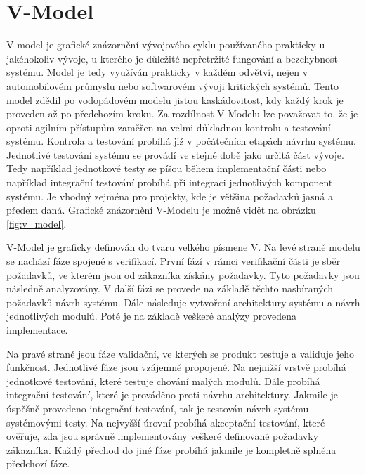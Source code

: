 \documentclass[czech,master]{diploma}
\begin{document}
\section{V-Model}
V-model je grafické znázornění vývojového cyklu používaného prakticky u jakéhokoliv vývoje, u kterého je důležité nepřetržité fungování a bezchybnost systému. Model je tedy využíván prakticky v každém odvětví, nejen v automobilovém průmyslu nebo softwarovém vývoji kritických systémů. Tento model zdědil po vodopádovém modelu jistou kaskádovitost, kdy každý krok je proveden až po předchozím kroku. Za rozdílnost V-Modelu lze považovat to, že je oproti agilním přístupům zaměřen na velmi důkladnou kontrolu a testování systému. Kontrola a testování probíhá již v počátečních etapách návrhu systému. Jednotlivé testování systému se provádí ve stejné době jako určitá část vývoje. Tedy například jednotkové testy se píšou během implementační části nebo například integrační testování probíhá při integraci jednotlivých komponent systému. Je vhodný zejména pro projekty, kde je většina požadavků jasná a předem daná. Grafické znázornění V-Modelu je možné vidět na obrázku \ref{fig:v_model}.

V-Model je graficky definován do tvaru velkého písmene V. Na levé straně modelu se nachází fáze spojené s verifikací. První fází v rámci verifikační části je sběr požadavků, ve kterém jsou od zákazníka získány požadavky. Tyto požadavky jsou následně analyzovány. V další fázi se provede na základě těchto nasbíraných požadavků návrh systému. Dále následuje vytvoření architektury systému a návrh jednotlivých modulů. Poté je na základě veškeré analýzy provedena implementace.

Na pravé straně jsou fáze validační, ve kterých se produkt testuje a validuje jeho funkčnost. Jednotlivé fáze jsou vzájemně propojené. Na nejnižší vrstvě probíhá jednotkové testování, které testuje chování malých modulů. Dále probíhá integrační testování, které je prováděno proti návrhu architektury. Jakmile je úspěšně provedeno integrační testování, tak je testován návrh systému systémovými testy. Na nejvyšší úrovní probíhá akceptační testování, které ověřuje, zda jsou správně implementovány veškeré definované požadavky zákazníka. Každý přechod do jiné fáze probíhá jakmile je kompletně splněna předchozí fáze.
\end{document}
